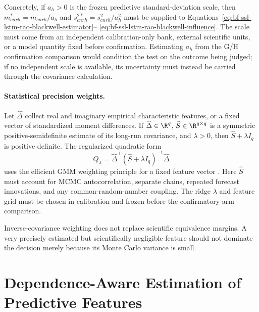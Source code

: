 Concretely, if $a_h>0$ is the frozen predictive standard-deviation scale, then
$m^*_{cnrh}=m_{cnrh}/a_h$ and
$s^{2*}_{cnrh}=s^2_{cnrh}/a_h^2$ must be supplied to
Equations~\eqref{eq:bf-ssl-lstm-rao-blackwell-estimator}--
\eqref{eq:bf-ssl-lstm-rao-blackwell-influence}.  The scale must come from an
independent calibration-only bank, external scientific units, or a model
quantity fixed before confirmation.  Estimating $a_h$ from the G/H
confirmation comparison would condition the test on the outcome being judged;
if no independent scale is available, its uncertainty must instead be carried
through the covariance calculation.

\paragraph{Statistical precision weights.}
Let $\widehat\Delta$ collect real and imaginary empirical characteristic
features, or a fixed vector of standardized moment differences.  If
$\widehat\Delta\in\R^q$, $\widehat S\in\R^{q\times q}$ is a symmetric
positive-semidefinite estimate of its long-run covariance, and $\lambda>0$,
then $\widehat S+\lambda I_q$ is positive definite.  The regularized quadratic
form
\begin{equation}
  Q_\lambda
  =\widehat\Delta^\top
    (\widehat S+\lambda I_q)^{-1}\widehat\Delta
  \label{eq:bf-ssl-lstm-gmm-weight}
\end{equation}
uses the efficient GMM weighting principle for a fixed feature vector
\citep{hansen1982gmm}.  Here $\widehat S$ must account for MCMC
autocorrelation, separate chains, repeated forecast innovations, and any
common-random-number coupling.  The ridge $\lambda$ and feature grid must be
chosen in calibration and frozen before the confirmatory arm comparison.

Inverse-covariance weighting does not replace scientific equivalence margins.
A very precisely estimated but scientifically negligible feature should not
dominate the decision merely because its Monte Carlo variance is small.

\section{Dependence-Aware Estimation of Predictive Features}
\label{sec:bf-ssl-lstm-dependence-aware-features}

